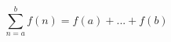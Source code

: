 \documentclass[12pt]{amsart}
\begin{document}
\sicpsize
\[
\sum_{n=a}^{b} f(n) = f(a) {} + ... {} + f(b)
\]
\end{document}
